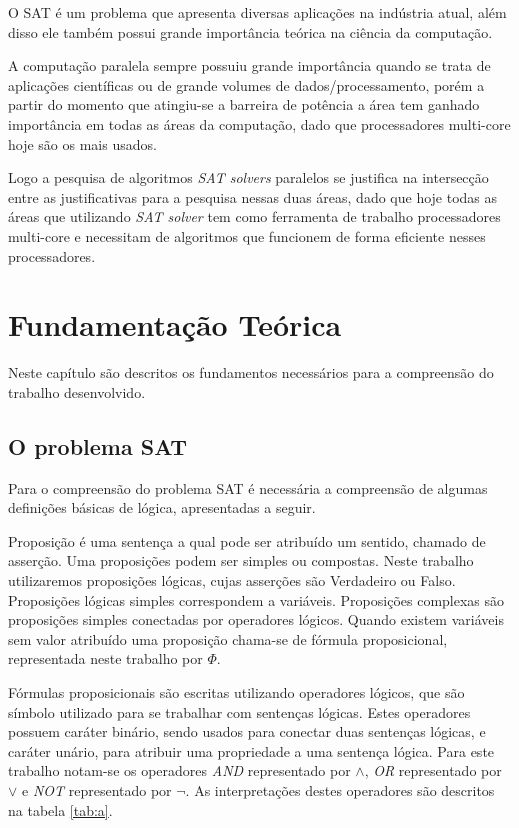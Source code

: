 \documentclass{ufsc-thesis}
\begin{document}
O SAT é um problema que apresenta diversas aplicações na indústria
atual, além disso ele também possui grande importância teórica 
na ciência da computação.

A computação paralela sempre possuiu grande importância quando 
se trata de aplicações científicas ou de grande volumes de 
dados/processamento, porém a partir do momento que atingiu-se 
a barreira de potência a área tem ganhado importância em todas as 
áreas da computação, dado que processadores multi-core hoje são 
os mais usados.

Logo a pesquisa de algoritmos \textit{SAT solvers} paralelos se justifica na 
intersecção entre as justificativas para a pesquisa nessas duas áreas,
dado que hoje todas as áreas que utilizando \textit{SAT solver} tem como ferramenta 
de trabalho processadores multi-core e necessitam de algoritmos que 
funcionem de forma eficiente nesses processadores.

\chapter{Fundamentação Teórica}
\label{chap:fund}

Neste capítulo são descritos os fundamentos necessários para a
compreensão do trabalho desenvolvido.

\section{O problema SAT}
\label{sec:sat}

Para o compreensão do problema SAT é necessária a compreensão 
de algumas definições básicas de lógica, apresentadas a seguir.

Proposição é uma sentença a qual pode ser atribuído um sentido, 
chamado de asserção. Uma proposições podem ser simples ou compostas. Neste 
trabalho utilizaremos proposições lógicas, cujas asserções são 
Verdadeiro ou Falso. Proposições lógicas simples correspondem a 
variáveis. Proposições complexas são 
proposições simples conectadas por operadores lógicos. Quando 
existem variáveis sem valor atribuído uma proposição chama-se 
de fórmula proposicional, representada neste trabalho por $\Phi$.

Fórmulas proposicionais são escritas utilizando operadores lógicos,
que são símbolo utilizado para se trabalhar com sentenças lógicas. 
Estes operadores possuem caráter binário, sendo usados para conectar 
duas sentenças lógicas, e caráter unário, para atribuir uma propriedade 
a uma sentença lógica. Para este trabalho notam-se os operadores 
\textit{AND} representado por $\wedge$, \textit{OR} representado 
por $\vee$ e \textit{NOT} representado por $\neg$. As interpretações 
destes operadores são descritos na tabela \ref{tab:a}.
\end{document}

